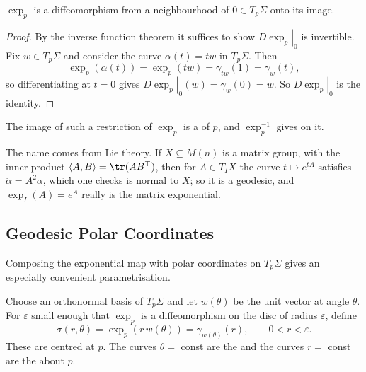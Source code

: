 \begin{proposition}
    $\exp_p$ is a diffeomorphism from a neighbourhood of $0 \in T_p\Sigma$ onto its image.
\end{proposition}
\begin{proof}
    By the inverse function theorem it suffices to show $\left.D\exp_p\right|_0$ is invertible. Fix $w \in T_p\Sigma$ and consider the curve $\alpha(t) = tw$ in $T_p\Sigma$. Then
    $$
    \exp_p(\alpha(t)) = \exp_p(tw) = \gamma_{tw}(1) = \gamma_w(t),
    $$
    so differentiating at $t = 0$ gives $\left.D\exp_p\right|_0(w) = \dot\gamma_w(0) = w$. So $\left.D\exp_p\right|_0$ is the identity.
\end{proof}

\begin{definition}
    The image of such a restriction of $\exp_p$ is a  of $p$, and $\exp_p^{-1}$ gives  on it.
\end{definition}

\begin{remark}
    The name comes from Lie theory. If $X \subseteq M(n)$ is a matrix group, with the inner product $\langle A, B\rangle = \tr(AB^\top)$, then for $A \in T_I X$ the curve $t \mapsto e^{tA}$ satisfies $\ddot\alpha = A^2\alpha$, which one checks is normal to $X$; so it is a geodesic, and $\exp_I(A) = e^A$ really is the matrix exponential.
\end{remark}

\subsection{Geodesic Polar Coordinates}

Composing the exponential map with polar coordinates on $T_p\Sigma$ gives an especially convenient parametrisation.

\begin{definition}
    Choose an orthonormal basis of $T_p\Sigma$ and let $w(\theta)$ be the unit vector at angle $\theta$. For $\varepsilon$ small enough that $\exp_p$ is a diffeomorphism on the disc of radius $\varepsilon$, define
    $$
    \sigma(r, \theta) = \exp_p\left(r\, w(\theta)\right) = \gamma_{w(\theta)}(r), \qquad 0 < r < \varepsilon.
    $$
    These are  centred at $p$. The curves $\theta = $ const are the  and the curves $r = $ const are the  about $p$.
\end{definition}

